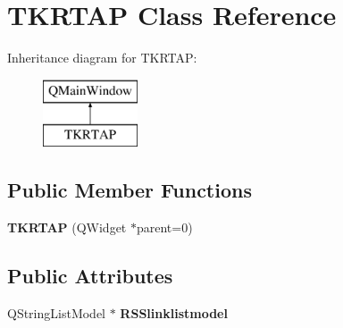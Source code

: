 \hypertarget{class_t_k_r_t_a_p}{\section{T\+K\+R\+T\+A\+P Class Reference}
\label{class_t_k_r_t_a_p}
}
Inheritance diagram for T\+K\+R\+T\+A\+P\+:\begin{figure}[H]
\begin{center}
\leavevmode
\includegraphics[height=2.000000cm]{class_t_k_r_t_a_p}
\end{center}
\end{figure}
\subsection*{Public Member Functions}
\begin{DoxyCompactItemize}
\item 
\hypertarget{class_t_k_r_t_a_p_ae3eb36f7ee1ed36edc17ac850a6e415a}{{\bfseries T\+K\+R\+T\+A\+P} (Q\+Widget $\ast$parent=0)}\label{class_t_k_r_t_a_p_ae3eb36f7ee1ed36edc17ac850a6e415a}

\end{DoxyCompactItemize}
\subsection*{Public Attributes}
\begin{DoxyCompactItemize}
\item 
\hypertarget{class_t_k_r_t_a_p_a8b4b0e92489a64cf5cd8276f77e6da9a}{Q\+String\+List\+Model $\ast$ {\bfseries R\+S\+Slinklistmodel}}\label{class_t_k_r_t_a_p_a8b4b0e92489a64cf5cd8276f77e6da9a}

\end{DoxyCompactItemize}
